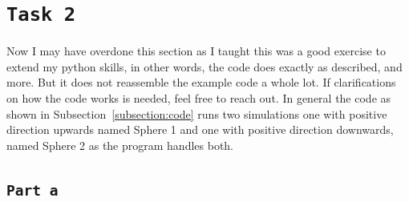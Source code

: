 \documentclass{article}
\let\oldsection\section
\renewcommand{\section}[1]{%
  \oldsection{\texttt{#1}} %
  \setcounter{subsection}{-1} %
  \setcounter{figure}{-1} %
}
\let\oldsubsection\subsection
\renewcommand{\subsection}[1]{%
  \oldsubsection{\texttt{#1}}%
  \setcounter{subsubsection}{-1}%
}
\begin{document}
\section{Task 2}
Now I may have overdone this section as I taught this was a good exercise to extend my python skills, in other words, the code does exactly as described, and more. But it does not reassemble the example code a whole lot. If clarifications on how the code works is needed, feel free to reach out.
In general the code as shown in Subsection~\ref{subsection:code} runs two simulations one with positive direction upwards named Sphere 1 and one with positive direction downwards, named Sphere 2 as the program handles both.

\clearpage
\subsection{Part a}
\end{document}
